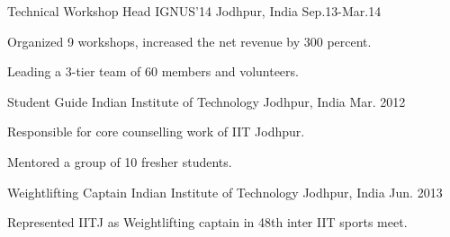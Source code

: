 

\begin{cventries}


      \cventry
        {Technical Workshop Head} %
        {IGNUS'14} %
        {Jodhpur, India} %
        {Sep.13-Mar.14} %
        {
          \begin{cvitems} %
            \item {Organized 9 workshops, increased the net revenue by 300 percent.}
            \item {Leading a 3-tier team of 60 members and volunteers.}
          \end{cvitems}
        }


      \cventry
        {Student Guide} %
        {Indian Institute of Technology} %
        {Jodhpur, India} %
        {Mar. 2012} %
        {
          \begin{cvitems} %
            \item {Responsible for core counselling work of IIT Jodhpur.}
            \item {Mentored a group of 10 fresher students.}
          \end{cvitems}
        }


  \cventry
    {Weightlifting Captain} %
    {Indian Institute of Technology} %
    {Jodhpur, India} %
    {Jun. 2013} %
    {
      \begin{cvitems} %
        \item {Represented IITJ as Weightlifting captain in 48th inter IIT sports meet.}
      \end{cvitems}
    }


\end{cventries}
